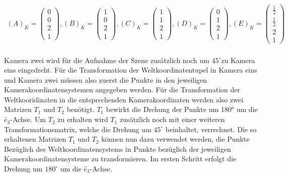 \begin{gather}
(A)_K=\begin{pmatrix}
0\\0\\2\\1
\end{pmatrix}, 
(B)_K=
\begin{pmatrix}
1\\0\\2\\1
\end{pmatrix},
(C)_K=
\begin{pmatrix}
1\\1\\2\\1
\end{pmatrix},
(D)_K=
\begin{pmatrix}
0\\1\\2\\1
\end{pmatrix},
(E)_K=
\begin{pmatrix}
\frac{1}{2}\\\frac{1}{2}\\2\\1
\end{pmatrix}
\end{gather}\\

Kamera zwei wird für die Aufnahme der Szene zusätzlich noch um \ensuremath{45^\circ}zu Kamera eins eingedreht.
Für die Transformation der Weltkoordinatentupel in Kamera eins und Kamera zwei müssen also zuerst die Punkte in den jeweiligen Kamerakoordinatensystemen angegeben werden. Für die Transformation der Weltkooridinaten in die entsprechenden Kamerakoordinaten werden also zwei Matrizen \ensuremath{T_1} und \ensuremath{T_2} benötigt. \ensuremath{T_1} bewirkt die Drehung der Punkte um 180° um die \ensuremath{\hat{e}_3}-Achse. Um \ensuremath{T_2} zu erhalten wird \ensuremath{T_1} zusätzlich noch mit einer weiteren Transformationsmatrix, welche die Drehung um \ensuremath{45^\circ} beinhaltet, verrechnet. Die so erhaltenen Matrizen \ensuremath{T_1} und \ensuremath{T_2} können nun dazu verwendet werden, die Punkte Bezüglich des Weltkoordinatensystems in Punkte bezüglich der jeweiligen Kamerakoordinatensysteme zu transformieren. Im ersten Schritt erfolgt die Drehung um \ensuremath{180^\circ} um die \ensuremath{\hat{e}_3}-Achse.


